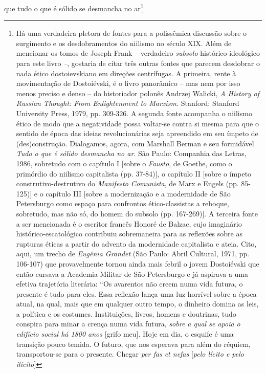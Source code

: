 que tudo o que é sólido se desmancha no ar\footnote{Há uma verdadeira
  pletora de fontes para a polissêmica discussão sobre o surgimento e os
  desdobramentos do niilismo no século XIX. Além de mencionar os tomos
  de Joseph Frank -- verdadeiro \emph{subsolo} histórico-ideológico para
  este livro \emph{--}, gostaria de citar três outras fontes que parecem
  desdobrar o nada ético dostoievskiano em direções centrífugas. A
  primeira, rente à movimentação de Dostoiévski, é o livro panorâmico --
  mas nem por isso menos preciso e denso -- do historiador polonês
  Andrzej Walicki, \emph{A History of Russian Thought: From
  Enlightenment to Marxism.} Stanford: Stanford University Press, 1979,
  pp. 309-326. A segunda fonte acompanha o niilismo ético de modo que a
  negatividade possa voltar-se contra si mesma para que o sentido de
  época das ideias revolucionárias seja apreendido em seu ímpeto de
  (des)construção. Dialogamos, agora, com Marshall Berman e seu
  formidável \emph{Tudo o que é sólido desmancha no ar}. São Paulo:
  Companhia das Letras, 1986, sobretudo com o capítulo I {[}sobre o
  \emph{Fausto}, de Goethe, como o primórdio do niilismo capitalista
  (pp. 37-84){]}, o capítulo II {[}sobre o ímpeto construtivo-destrutivo
  do \emph{Manifesto Comunista}, de Marx e Engels (pp. 85-125){]} e o
  capítulo III {[}sobre a modernização e a modernidade de São
  Petersburgo como espaço para confrontos ético-classistas a reboque,
  sobretudo, mas não só, do homem do subsolo (pp. 167-269){]}. A
  terceira fonte a ser mencionada é o escritor francês Honoré de Balzac,
  cujo imaginário histórico-escatológico contribuiu sobremaneira para as
  reflexões sobre as rupturas éticas a partir do advento da modernidade
  capitalista e ateia. Cito, aqui, um trecho de \emph{Eugênia Grandet}
  (São Paulo: Abril Cultural, 1971, pp. 106-107) que provavelmente
  tornou ainda mais febril o jovem Dostoiévski que então cursava a
  Academia Militar de São Petersburgo e já aspirava a uma efetiva
  trajetória literária: ``Os avarentos não creem numa vida futura, o
  presente é tudo para eles. Essa reflexão lança uma luz horrível sobre
  a época atual, na qual, mais que em qualquer outro tempo, o dinheiro
  domina as leis, a política e os costumes. Instituições, livros, homens
  e doutrinas, tudo conspira para minar a crença numa vida futura,
  \emph{sobre a qual se apoia o edifício social há 1800 anos} {[}grifo
  meu{]}. Hoje em dia, o esquife é uma transição pouco temida. O futuro,
  que nos esperava para além do réquiem, transportou-se para o presente.
  Chegar \emph{per fas et nefas} {[}\emph{pelo lícito e pelo ilícito}{]}
}
